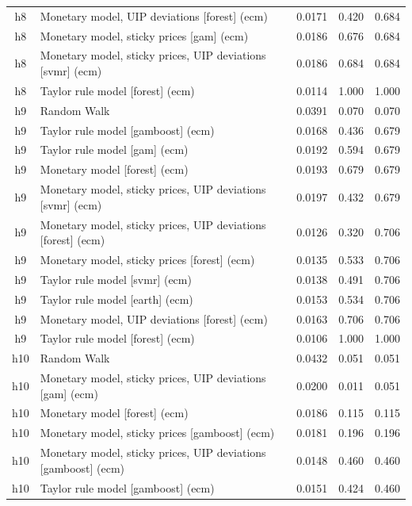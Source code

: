 \begin{ThreePartTable}
\begin{longtable}[t]{cp{5.5cm}ccc}
h8 & \raggedright Monetary model, UIP deviations [forest] (ecm) & 0.0171 & 0.420 & 0.684\\
h8 & \raggedright Monetary model, sticky prices [gam] (ecm) & 0.0186 & 0.676 & 0.684\\
h8 & \raggedright Monetary model, sticky prices, UIP deviations [svmr] (ecm) & 0.0186 & 0.684 & 0.684\\
h8 & \raggedright Taylor rule model [forest] (ecm) & 0.0114 & 1.000 & 1.000\\
\addlinespace
h9 & \raggedright Random Walk & 0.0391 & 0.070 & 0.070\\
h9 & \raggedright Taylor rule model [gamboost] (ecm) & 0.0168 & 0.436 & 0.679\\
h9 & \raggedright Taylor rule model [gam] (ecm) & 0.0192 & 0.594 & 0.679\\
h9 & \raggedright Monetary model [forest] (ecm) & 0.0193 & 0.679 & 0.679\\
h9 & \raggedright Monetary model, sticky prices, UIP deviations [svmr] (ecm) & 0.0197 & 0.432 & 0.679\\
h9 & \raggedright Monetary model, sticky prices, UIP deviations [forest] (ecm) & 0.0126 & 0.320 & 0.706\\
h9 & \raggedright Monetary model, sticky prices [forest] (ecm) & 0.0135 & 0.533 & 0.706\\
h9 & \raggedright Taylor rule model [svmr] (ecm) & 0.0138 & 0.491 & 0.706\\
h9 & \raggedright Taylor rule model [earth] (ecm) & 0.0153 & 0.534 & 0.706\\
h9 & \raggedright Monetary model, UIP deviations [forest] (ecm) & 0.0163 & 0.706 & 0.706\\
h9 & \raggedright Taylor rule model [forest] (ecm) & 0.0106 & 1.000 & 1.000\\
\addlinespace
h10 & \raggedright Random Walk & 0.0432 & 0.051 & 0.051\\
h10 & \raggedright Monetary model, sticky prices, UIP deviations [gam] (ecm) & 0.0200 & 0.011 & 0.051\\
h10 & \raggedright Monetary model [forest] (ecm) & 0.0186 & 0.115 & 0.115\\
h10 & \raggedright Monetary model, sticky prices [gamboost] (ecm) & 0.0181 & 0.196 & 0.196\\
h10 & \raggedright Monetary model, sticky prices, UIP deviations [gamboost] (ecm) & 0.0148 & 0.460 & 0.460\\
h10 & \raggedright Taylor rule model [gamboost] (ecm) & 0.0151 & 0.424 & 0.460\\

\end{longtable}
\end{ThreePartTable}
